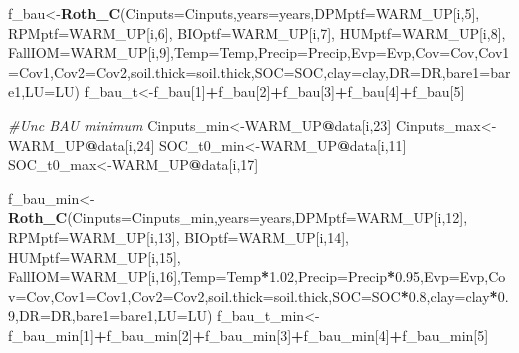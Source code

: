 \documentclass[
  10pt,
  b5paper,
]{book}
\newenvironment{Shaded}{\begin{snugshade}}{\end{snugshade}}
\newcommand{\CommentTok}[1]{\textcolor[rgb]{0.56,0.35,0.01}{\textit{#1}}}
\newcommand{\DataTypeTok}[1]{\textcolor[rgb]{0.13,0.29,0.53}{#1}}
\newcommand{\DecValTok}[1]{\textcolor[rgb]{0.00,0.00,0.81}{#1}}
\newcommand{\FloatTok}[1]{\textcolor[rgb]{0.00,0.00,0.81}{#1}}
\newcommand{\KeywordTok}[1]{\textcolor[rgb]{0.13,0.29,0.53}{\textbf{#1}}}
\newcommand{\NormalTok}[1]{#1}
\newcommand{\OperatorTok}[1]{\textcolor[rgb]{0.81,0.36,0.00}{\textbf{#1}}}
\begin{document}
\begin{Shaded}
\begin{Highlighting}[]
{\NormalTok{f_bau<-}\KeywordTok{Roth_C}\NormalTok{(}\DataTypeTok{Cinputs=}\NormalTok{Cinputs,}\DataTypeTok{years=}\NormalTok{years,}\DataTypeTok{DPMptf=}\NormalTok{WARM_UP[i,}\DecValTok{5}\NormalTok{], }\DataTypeTok{RPMptf=}\NormalTok{WARM_UP[i,}\DecValTok{6}\NormalTok{], }\DataTypeTok{BIOptf=}\NormalTok{WARM_UP[i,}\DecValTok{7}\NormalTok{], }\DataTypeTok{HUMptf=}\NormalTok{WARM_UP[i,}\DecValTok{8}\NormalTok{], }\DataTypeTok{FallIOM=}\NormalTok{WARM_UP[i,}\DecValTok{9}\NormalTok{],}\DataTypeTok{Temp=}\NormalTok{Temp,}\DataTypeTok{Precip=}\NormalTok{Precip,}\DataTypeTok{Evp=}\NormalTok{Evp,}\DataTypeTok{Cov=}\NormalTok{Cov,}\DataTypeTok{Cov1=}\NormalTok{Cov1,}\DataTypeTok{Cov2=}\NormalTok{Cov2,}\DataTypeTok{soil.thick=}\NormalTok{soil.thick,}\DataTypeTok{SOC=}\NormalTok{SOC,}\DataTypeTok{clay=}\NormalTok{clay,}\DataTypeTok{DR=}\NormalTok{DR,}\DataTypeTok{bare1=}\NormalTok{bare1,}\DataTypeTok{LU=}\NormalTok{LU)}
\NormalTok{f_bau_t<-f_bau[}\DecValTok{1}\NormalTok{]}\OperatorTok{+}\NormalTok{f_bau[}\DecValTok{2}\NormalTok{]}\OperatorTok{+}\NormalTok{f_bau[}\DecValTok{3}\NormalTok{]}\OperatorTok{+}\NormalTok{f_bau[}\DecValTok{4}\NormalTok{]}\OperatorTok{+}\NormalTok{f_bau[}\DecValTok{5}\NormalTok{]}

\CommentTok{#Unc BAU minimum }
\NormalTok{Cinputs_min<-WARM_UP}\OperatorTok{@}\NormalTok{data[i,}\DecValTok{23}\NormalTok{]}
\NormalTok{Cinputs_max<-WARM_UP}\OperatorTok{@}\NormalTok{data[i,}\DecValTok{24}\NormalTok{]}
\NormalTok{SOC_t0_min<-WARM_UP}\OperatorTok{@}\NormalTok{data[i,}\DecValTok{11}\NormalTok{]}
\NormalTok{SOC_t0_max<-WARM_UP}\OperatorTok{@}\NormalTok{data[i,}\DecValTok{17}\NormalTok{]}

\NormalTok{f_bau_min<-}\KeywordTok{Roth_C}\NormalTok{(}\DataTypeTok{Cinputs=}\NormalTok{Cinputs_min,}\DataTypeTok{years=}\NormalTok{years,}\DataTypeTok{DPMptf=}\NormalTok{WARM_UP[i,}\DecValTok{12}\NormalTok{], }\DataTypeTok{RPMptf=}\NormalTok{WARM_UP[i,}\DecValTok{13}\NormalTok{], }\DataTypeTok{BIOptf=}\NormalTok{WARM_UP[i,}\DecValTok{14}\NormalTok{], }\DataTypeTok{HUMptf=}\NormalTok{WARM_UP[i,}\DecValTok{15}\NormalTok{], }\DataTypeTok{FallIOM=}\NormalTok{WARM_UP[i,}\DecValTok{16}\NormalTok{],}\DataTypeTok{Temp=}\NormalTok{Temp}\OperatorTok{*}\FloatTok{1.02}\NormalTok{,}\DataTypeTok{Precip=}\NormalTok{Precip}\OperatorTok{*}\FloatTok{0.95}\NormalTok{,}\DataTypeTok{Evp=}\NormalTok{Evp,}\DataTypeTok{Cov=}\NormalTok{Cov,}\DataTypeTok{Cov1=}\NormalTok{Cov1,}\DataTypeTok{Cov2=}\NormalTok{Cov2,}\DataTypeTok{soil.thick=}\NormalTok{soil.thick,}\DataTypeTok{SOC=}\NormalTok{SOC}\OperatorTok{*}\FloatTok{0.8}\NormalTok{,}\DataTypeTok{clay=}\NormalTok{clay}\OperatorTok{*}\FloatTok{0.9}\NormalTok{,}\DataTypeTok{DR=}\NormalTok{DR,}\DataTypeTok{bare1=}\NormalTok{bare1,}\DataTypeTok{LU=}\NormalTok{LU)}
\NormalTok{f_bau_t_min<-f_bau_min[}\DecValTok{1}\NormalTok{]}\OperatorTok{+}\NormalTok{f_bau_min[}\DecValTok{2}\NormalTok{]}\OperatorTok{+}\NormalTok{f_bau_min[}\DecValTok{3}\NormalTok{]}\OperatorTok{+}\NormalTok{f_bau_min[}\DecValTok{4}\NormalTok{]}\OperatorTok{+}\NormalTok{f_bau_min[}\DecValTok{5}\NormalTok{]}

}
\end{Highlighting}
\end{Shaded}
\end{document}
